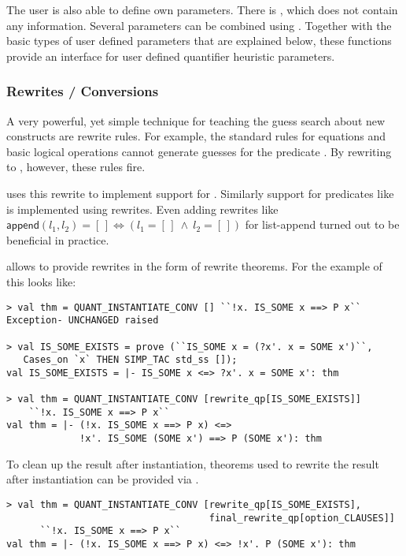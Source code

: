 The user is also able to define own parameters. There
is , which does not contain any information. Several
parameters can be combined using
. Together with the basic types of user defined
parameters that are explained below, these functions provide an
interface for user defined quantifier heuristic parameters.

\subsubsection{Rewrites / Conversions}

A very powerful, yet simple technique for teaching the guess search
about new constructs are rewrite rules. For example, the standard rules
for equations and basic logical operations
cannot generate guesses for the predicate . By
rewriting  to , however, these rules fire.

 uses this rewrite to implement support for
. Similarly support for predicates like  is
implemented using rewrites. Even adding
rewrites like $\textsf{append}(l_1, l_2) = [\,] \Longleftrightarrow (l_1 =
[\,]\ \wedge\ l_2 = [\,])$ for list-append turned out to be beneficial
in practice.
\bigskip

 allows to provide rewrites in the form of rewrite theorems.
For the example of  this looks like:

\begin{session}
\begin{verbatim}
> val thm = QUANT_INSTANTIATE_CONV [] ``!x. IS_SOME x ==> P x``
Exception- UNCHANGED raised

> val IS_SOME_EXISTS = prove (``IS_SOME x = (?x'. x = SOME x')``,
   Cases_on `x` THEN SIMP_TAC std_ss []);
val IS_SOME_EXISTS = |- IS_SOME x <=> ?x'. x = SOME x': thm

> val thm = QUANT_INSTANTIATE_CONV [rewrite_qp[IS_SOME_EXISTS]]
    ``!x. IS_SOME x ==> P x``
val thm = |- (!x. IS_SOME x ==> P x) <=>
             !x'. IS_SOME (SOME x') ==> P (SOME x'): thm
\end{verbatim}
\end{session}

To clean up the result after instantiation, theorems used to rewrite the result after instantiation can be provided via
.
\begin{session}
\begin{verbatim}
> val thm = QUANT_INSTANTIATE_CONV [rewrite_qp[IS_SOME_EXISTS],
                                    final_rewrite_qp[option_CLAUSES]]
      ``!x. IS_SOME x ==> P x``
val thm = |- (!x. IS_SOME x ==> P x) <=> !x'. P (SOME x'): thm
\end{verbatim}
\end{session}

